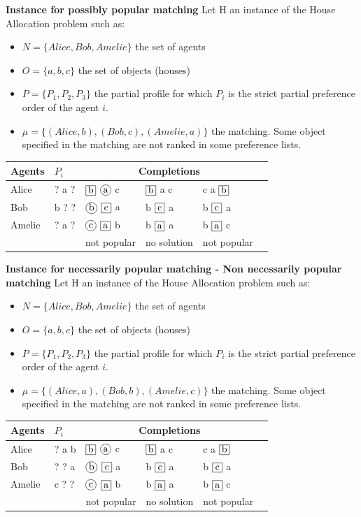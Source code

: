 \documentclass{article}
\newcommand*\encircled[1]{\tikz[baseline=(char.base)]{
            \node[shape=circle,draw,inner sep=0.25pt,minimum size=1em] (char) {\vphantom{Ag}#1};}}
\newcommand*\framed[1]{\tikz[baseline=(char.base)]{
            \node[draw,inner sep=0.25pt,minimum size=1em] (char) {\vphantom{Ag}#1};}}
\begin{document}
\textbf{Instance for possibly popular matching}
Let H an instance of the House Allocation problem such as:
\begin{itemize}
    \item $N =  \{Alice, Bob, Amelie \}$ the set of agents
    \item $O = \{ a, b, c \} $ the set of objects (houses)
    \item $P = \{P_1, P_2, P_3\}$ the partial profile for which $P_i$ is the strict partial preference order of the agent $i$.
    \item $\mu = \{ (Alice, b), (Bob, c), (Amelie, a)\}$ the matching. Some object specified in the matching are not ranked in some preference lists.
\end{itemize} 
\begin{center}
\begin{tabular}{llllll}
\toprule
\textbf{Agents} & \textbf{$P_i$} & \multicolumn{3}{c}{\textbf{Completions}} \\
\midrule
Alice & ? a ? & $\framed{b}$ $\encircled{a}$ c & $\framed{b}$ a c & c a $\framed{b}$ \\
Bob & b ? ? & $\encircled{b}$ $\framed{c}$ a &  b $\framed{c}$ a & b $\framed{c}$ a \\
Amelie & ? a ? & $\encircled{c}$ $\framed{a}$ b & b $\framed{a}$ a & b $\framed{a}$ c \\
 & & not popular & no solution & not popular \\
\bottomrule
\end{tabular}
\end{center}

\textbf{Instance for necessarily popular matching - Non necessarily popular matching}
Let H an instance of the House Allocation problem such as:
\begin{itemize}
    \item $N =  \{Alice, Bob, Amelie \}$ the set of agents
    \item $O = \{ a, b, c \} $ the set of objects (houses)
    \item $P = \{P_1, P_2, P_3\}$ the partial profile for which $P_i$ is the strict partial preference order of the agent $i$.
    \item $\mu = \{ (Alice, a), (Bob, b), (Amelie, c)\}$ the matching. Some object specified in the matching are not ranked in some preference lists.
\end{itemize} 
\begin{center}
\begin{tabular}{llllll}
\toprule
\textbf{Agents} & \textbf{$P_i$} & \multicolumn{3}{c}{\textbf{Completions}} \\
\midrule
Alice & ? a b & $\framed{b}$ $\encircled{a}$ c & $\framed{b}$ a c & c a $\framed{b}$ \\
Bob & ? ? a & $\encircled{b}$ $\framed{c}$ a &  b $\framed{c}$ a & b $\framed{c}$ a \\
Amelie & c ? ? & $\encircled{c}$ $\framed{a}$ b & b $\framed{a}$ a & b $\framed{a}$ c \\
 & & not popular & no solution & not popular \\
\bottomrule
\end{tabular}
\end{center}
\end{document}
